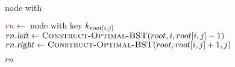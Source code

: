 
\begin{algorithm}[H]
  \begin{algorithmic}[1]
	\State \Return node with 
      \EndIf

      \hStatex
      \State $\textcolor{purple}{rn} \gets \text{ node with key } k_{root[i,j]}$
      \State $rn.\textsl{left} \gets \Call{Construct-Optimal-BST}{root, i, root[i,j]-1}$
      \State $rn.\textsl{right} \gets \Call{Construct-Optimal-BST}{root, root[i,j]+1, j}$

      \hStatex
      \State \Return $rn$
    \EndProcedure
  \end{algorithmic}
\end{algorithm}
